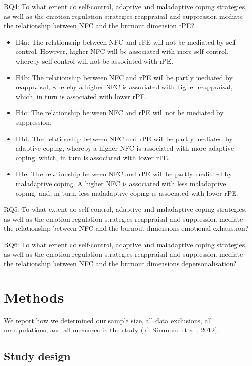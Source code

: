 \documentclass[
  man]{apa6}
\begin{document}
RQ4: To what extent do self-control, adaptive and maladaptive coping strategies, as well as the emotion regulation strategies reappraisal and suppression mediate the relationship between NFC and the burnout dimension rPE?

\begin{itemize}
\item
  H4a: The relationship between NFC and rPE will not be mediated by self-control. However, higher NFC will be associated with more self-control, whereby self-control will not be associated with rPE.
\item
  H4b: The relationship between NFC and rPE will be partly mediated by reappraisal, whereby a higher NFC is associated with higher reappraisal, which, in turn is associated with lower rPE.
\item
  H4c: The relationship between NFC and rPE will not be mediated by suppression.
\item
  H4d: The relationship between NFC and rPE will be partly mediated by adaptive coping, whereby a higher NFC is associated with more adaptive coping, which, in turn is associated with lower rPE.
\item
  H4e: The relationship between NFC and rPE will be partly mediated by maladaptive coping. A higher NFC is associated with less maladaptive coping, and, in turn, less maladaptive coping is associated with lower rPE.
\end{itemize}

RQ5: To what extent do self-control, adaptive and maladaptive coping strategies, as well as the emotion regulation strategies reappraisal and suppression mediate the relationship between NFC and the burnout dimensions emotional exhaustion?

RQ6: To what extent do self-control, adaptive and maladaptive coping strategies, as well as the emotion regulation strategies reappraisal and suppression mediate the relationship between NFC and the burnout dimensions depersonalization?

\section{Methods}\label{methods}

We report how we determined our sample size, all data exclusions, all manipulations, and all measures in the study (cf. Simmons et al., 2012).

\subsection{Study design}\label{study-design}
\end{document}
